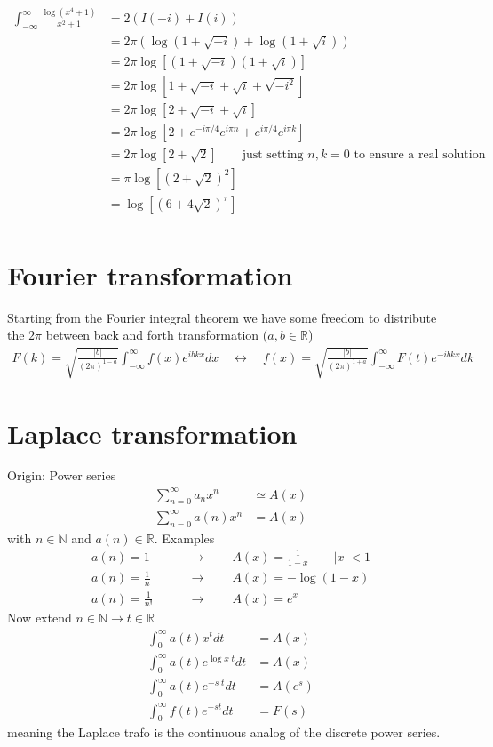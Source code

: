 \documentclass[../main.tex]{subfiles}
\begin{document}
\begin{align}
\int_{-\infty}^{\infty}\frac{\log(x^4+1)}{x^2+1}
&=2\left(I(-i)+I(i)\right)\\
&=2\pi\left(\log(1+\sqrt{-i})+\log(1+\sqrt{i})\right)\\
&=2\pi\log[(1+\sqrt{-i})(1+\sqrt{i})]\\
&=2\pi\log[1+\sqrt{-i}+\sqrt{i}+\sqrt{-i^2}]\\
&=2\pi\log[2+\sqrt{-i}+\sqrt{i}]\\
&=2\pi\log[2+e^{-i\pi/4}e^{i\pi n}+e^{i\pi/4}e^{i\pi k}]\\
&=2\pi\log[2+\sqrt{2}]\qquad\text{just setting $n,k=0$ to ensure a real solution}\\
&=\pi\log[(2+\sqrt{2})^2]\\
&=\log[(6+4\sqrt{2})^\pi]\\
\end{align}


\section{Fourier transformation}
Starting from the Fourier integral theorem we have some freedom to distribute the $2\pi$ between back and forth transformation ($a,b\in\mathbb{R}$)
\begin{align}
    F(k)=\sqrt{\frac{|b|}{(2\pi)^{1-a}}}\int_{-\infty}^\infty f(x)e^{ibkx}dx\quad\leftrightarrow\quad f(x)=\sqrt{\frac{|b|}{(2\pi)^{1+a}}}\int_{-\infty}^\infty F(t)e^{-ibkx}dk
\end{align}

\section{Laplace transformation}
Origin: Power series
\begin{align}
\sum_{n=0}^\infty a_n x^n&\simeq A(x)\\
\sum_{n=0}^\infty a(n) x^n&= A(x)
\end{align}
with $n\in\mathbb{N}$ and $a(n)\in\mathbb{R}$. Examples
\begin{align}
a(n)=1\qquad&\rightarrow\qquad A(x)=\frac{1}{1-x}\qquad|x|<1\\
a(n)=\frac{1}{n}\qquad&\rightarrow\qquad A(x)=-\log(1-x)\\
a(n)=\frac{1}{n!}\qquad&\rightarrow\qquad A(x)=e^x
\end{align}
Now extend $n\in\mathbb{N}\rightarrow t\in\mathbb{R}$
\begin{align}
\int_0^\infty a(t) x^t dt&=A(x)\\
\int_0^\infty a(t) e^{\log x\;t} dt&=A(x)\\
\int_0^\infty a(t) e^{-s\;t} dt&=A(e^{s})\\
\int_0^\infty f(t) e^{-st} dt&=F(s)
\end{align}
meaning the Laplace trafo is the continuous analog of the discrete power series.
\end{document}
